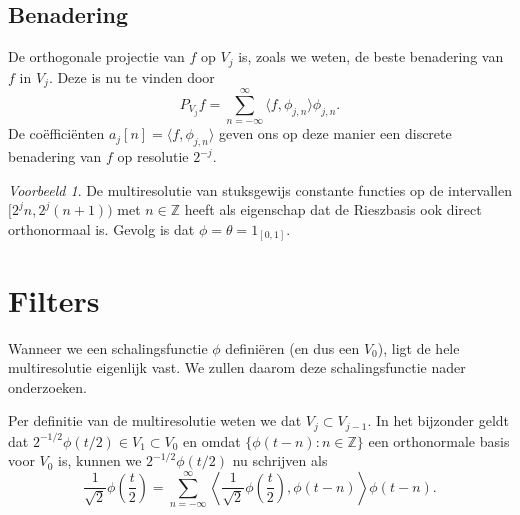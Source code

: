 \documentclass[11pt]{report}
\theoremstyle{plain}
\theoremstyle{definition}
\theoremstyle{remark}
\newtheorem*{voorbeeld}{Voorbeeld}
\newcommand{\Z}{\mathbb{Z}}
\begin{document}
\subsection{Benadering} De orthogonale projectie van $f$ op $V_j$ is, zoals we weten, de beste benadering van $f$ in $V_j$. Deze is nu te vinden door
\[
	P_{V_j} f = \sum_{n=-\infty}^\infty \langle f, \phi_{j,n} \rangle \phi_{j,n}.
\]
De co\"effici\"enten $a_j[n] = \langle f, \phi_{j,n} \rangle$ geven ons op deze manier een discrete benadering van $f$ op resolutie $2^{-j}$.

\begin{voorbeeld}
  De multiresolutie van stuksgewijs constante functies op de intervallen $[2^jn, 2^j(n+1))$ met $n \in \Z$ heeft als eigenschap dat de Rieszbasis ook direct orthonormaal is. Gevolg is dat $\phi = \theta = 1_{[0,1]}$.
\end{voorbeeld}

\section{Filters}
Wanneer we een schalingsfunctie $\phi$ defini\"eren (en dus een $V_0$), ligt de hele multiresolutie eigenlijk vast. We zullen daarom deze schalingsfunctie nader onderzoeken.

Per definitie van de multiresolutie weten we dat $V_j \subset V_{j-1}$. In het bijzonder geldt dat $2^{-1/2}\phi(t/2) \in V_1 \subset V_0$ en omdat $\{ \phi(t-n): n \in \Z\}$ een orthonormale basis voor $V_0$ is, kunnen we $2^{-1/2} \phi(t/2)$ nu schrijven als
\[
  \frac{1}{\sqrt{2}} \phi\left(\frac{t}{2}\right) = \sum_{n=-\infty}^{\infty} \left\langle \frac{1}{\sqrt{2}} \phi\left(\frac{t}{2}\right), \phi(t-n) \right\rangle \phi(t-n).
\]
\end{document}
